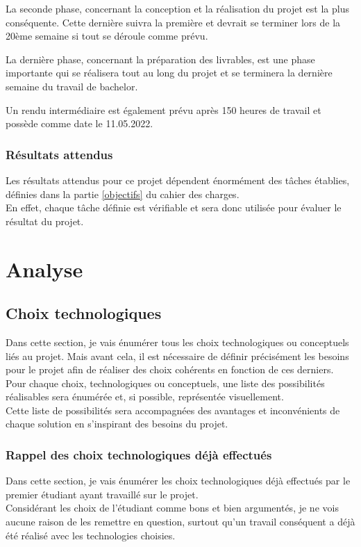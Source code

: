 \documentclass[
    iai, %
    il, %
]{heig-tb}
\begin{document}
La seconde phase, concernant la conception et la réalisation du projet est la plus conséquente.
Cette dernière suivra la première et devrait se terminer lors de la 20ème semaine si tout se déroule comme prévu.

La dernière phase, concernant la préparation des livrables, est une phase importante qui se réalisera tout au long du projet et se terminera la dernière semaine du travail de bachelor.

Un rendu intermédiaire est également prévu après 150 heures de travail et possède comme date le 11.05.2022.

\subsection{Résultats attendus}

Les résultats attendus pour ce projet dépendent énormément des tâches établies, définies dans la partie \ref{objectifs} du cahier des charges.\\
En effet, chaque tâche définie est vérifiable et sera donc utilisée pour évaluer le résultat du projet.
\newpage


\chapter{Analyse}

\section{Choix technologiques}

Dans cette section, je vais énumérer tous les choix technologiques ou conceptuels liés au projet.
Mais avant cela, il est nécessaire de définir précisément les besoins pour le projet afin de réaliser des choix cohérents en fonction de ces derniers.\\
Pour chaque choix, technologiques ou conceptuels, une liste des possibilités réalisables sera énumérée et, si possible, représentée visuellement.\\
Cette liste de possibilités sera accompagnées des avantages et inconvénients de chaque solution en s'inspirant des besoins du projet.

\subsection{Rappel des choix technologiques déjà effectués}
Dans cette section, je vais énumérer les choix technologiques déjà effectués par le premier étudiant ayant travaillé sur le projet.\\
Considérant les choix de l'étudiant comme bons et bien argumentés, je ne vois aucune raison de les remettre en question, surtout qu'un travail conséquent a déjà été réalisé avec les technologies choisies.
\end{document}
